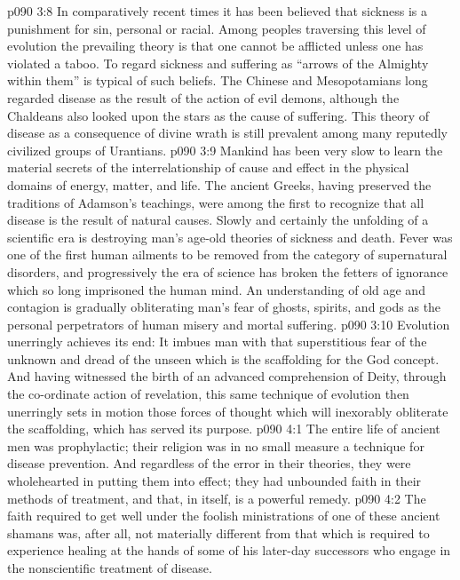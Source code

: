 \pc \vs p090 3:8 \bibnobreakspace {} In comparatively recent times it has been believed that sickness is a punishment for sin, personal or racial. Among peoples traversing this level of evolution the prevailing theory is that one cannot be afflicted unless one has violated a taboo. To regard sickness and suffering as “arrows of the Almighty within them” is typical of such beliefs. The Chinese and Mesopotamians long regarded disease as the result of the action of evil demons, although the Chaldeans also looked upon the stars as the cause of suffering. This theory of disease as a consequence of divine wrath is still prevalent among many reputedly civilized groups of Urantians.
\pc \vs p090 3:9 \bibnobreakspace {} Mankind has been very slow to learn the material secrets of the interrelationship of cause and effect in the physical domains of energy, matter, and life. The ancient Greeks, having preserved the traditions of Adamson’s teachings, were among the first to recognize that all disease is the result of natural causes. Slowly and certainly the unfolding of a scientific era is destroying man’s age\hyp{}old theories of sickness and death. Fever was one of the first human ailments to be removed from the category of supernatural disorders, and progressively the era of science has broken the fetters of ignorance which so long imprisoned the human mind. An understanding of old age and contagion is gradually obliterating man’s fear of ghosts, spirits, and gods as the personal perpetrators of human misery and mortal suffering.
\pc \vs p090 3:10 Evolution unerringly achieves its end: It imbues man with that superstitious fear of the unknown and dread of the unseen which is the scaffolding for the God concept. And having witnessed the birth of an advanced comprehension of Deity, through the co\hyp{}ordinate action of revelation, this same technique of evolution then unerringly sets in motion those forces of thought which will inexorably obliterate the scaffolding, which has served its purpose.\plusone
{}
\vs p090 4:1 The entire life of ancient men was prophylactic; their religion was in no small measure a technique for disease prevention. And regardless of the error in their theories, they were wholehearted in putting them into effect; they had unbounded faith in their methods of treatment, and that, in itself, is a powerful remedy.
\pc \vs p090 4:2 The faith required to get well under the foolish ministrations of one of these ancient shamans was, after all, not materially different from that which is required to experience healing at the hands of some of his later\hyp{}day successors who engage in the nonscientific treatment of disease.

